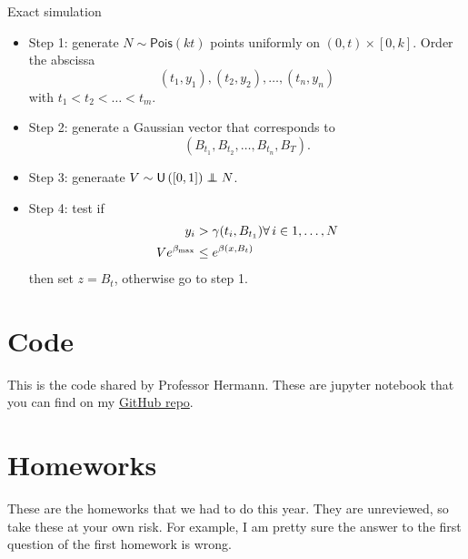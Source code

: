 \documentclass[12pt]{report}
\begin{document}
\begin{algobox}{Exact simulation}
	\begin{itemize}
		\item Step 1: generate $N\sim\mathsf{Pois}(kt)$ points uniformly on $(0,t)\times[0,k]$. Order the abscissa 
		\begin{equation*}
			(t_{1},y_{1}),(t_{2},y_{2}),\ldots,(t_{n},y_n)
		\end{equation*}
		with $t_1<t_2<\ldots<t_m$.
		 \item Step 2: generate a Gaussian vector that corresponds to
		\begin{equation*}
			\left(B_{t_{1}},B_{t_{2}},\ldots,B_{t_{n}},B_{T}\right).
		\end{equation*}
		\item Step 3: generaate $V\distunif{[0,1]}\independent N$.
		\item Step 4: test if
		\begin{align*}
			y_{i}&>\gamma(t_{i},B_{t_{1}})\forall\, i\in{1,\ldots,N}\\
			Ve^{\beta_{\max}}&\leq e^{\beta(x,B_{t})}
		\end{align*}
		then set $z=B_{t}$, otherwise go to step 1.
	\end{itemize}
\end{algobox}
\appendix 
\chapter{Code}
This is the code shared by Professor Hermann. These are jupyter notebook that you can find on my \href{https://github.com/godblessourdeadkotatsu/lecture-notes-2024-25/tree/main/SP}{GitHub repo}. \faGithub






\chapter{Homeworks}
These are the homeworks that we had to do this year. They are unreviewed, so take these at your own risk. For example, I am pretty sure the answer to the first question of the first homework is wrong.


\listoffigures  
\end{document}
